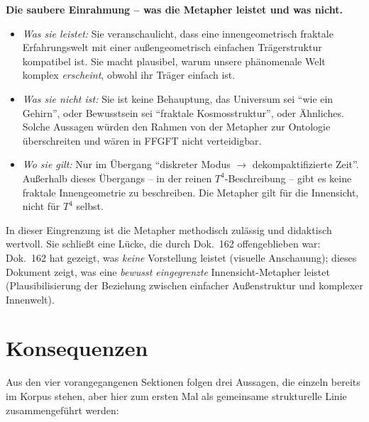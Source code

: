 \textbf{Die saubere Einrahmung -- was die Metapher leistet und was
nicht.}

\begin{itemize}[leftmargin=2em,itemsep=2pt,topsep=2pt]
  \item \emph{Was sie leistet:} Sie veranschaulicht, dass eine
        innengeometrisch fraktale Erfahrungswelt mit einer
        außengeometrisch einfachen Trägerstruktur kompatibel ist.
        Sie macht plausibel, warum unsere phänomenale Welt
        komplex \emph{erscheint}, obwohl ihr Träger einfach ist.
  \item \emph{Was sie nicht ist:} Sie ist keine Behauptung, das
        Universum sei \enquote{wie ein Gehirn}, oder Bewusstsein
        sei \enquote{fraktale Kosmosstruktur}, oder Ähnliches.
        Solche Aussagen würden den Rahmen von der Metapher zur
        Ontologie überschreiten und wären in FFGFT nicht
        verteidigbar.
  \item \emph{Wo sie gilt:} Nur im Übergang
        \enquote{diskreter Modus $\to$ dekompaktifizierte Zeit}.
        Außerhalb dieses Übergangs -- in der reinen
        $T^4$-Beschreibung -- gibt es keine fraktale Innengeometrie
        zu beschreiben. Die Metapher gilt für die Innensicht, nicht
        für $T^4$ selbst.
\end{itemize}

In dieser Eingrenzung ist die Metapher methodisch zulässig und
didaktisch wertvoll. Sie schließt eine Lücke, die durch Dok.~162
offengeblieben war: Dok.~162 hat gezeigt, was \emph{keine} Vorstellung
leistet (visuelle Anschauung); dieses Dokument zeigt, was eine
\emph{bewusst eingegrenzte} Innensicht-Metapher leistet (Plausibilisierung
der Beziehung zwischen einfacher Außenstruktur und komplexer Innenwelt).

\section{Konsequenzen}

Aus den vier vorangegangenen Sektionen folgen drei Aussagen, die
einzeln bereits im Korpus stehen, aber hier zum ersten Mal als
gemeinsame strukturelle Linie zusammengeführt werden:

